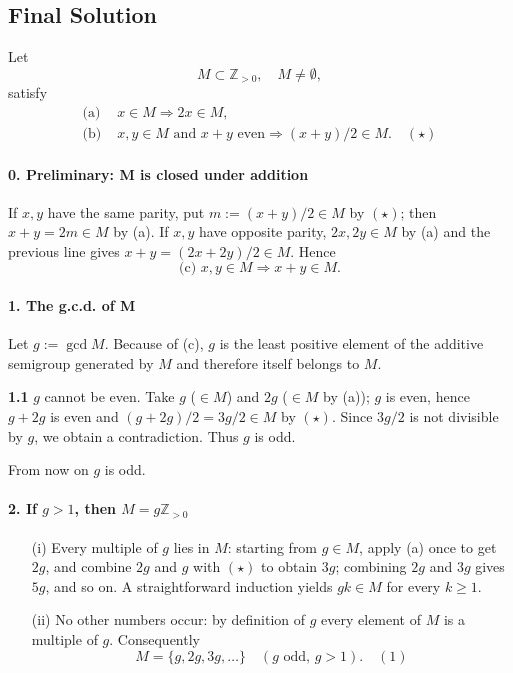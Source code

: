 \documentclass[12pt,a4paper]{article}
\theoremstyle{definition}
\begin{document}
\subsection{Final Solution}
Let
\[
M \subset \mathbb{Z}_{>0}, \quad M \neq \emptyset,
\]
satisfy
\begin{align}
\text{(a) } &x \in M \Rightarrow 2x \in M, \\
\text{(b) } &x, y \in M \text{ and } x+y \text{ even} \Rightarrow (x+y)/2 \in M. \quad (\star)
\end{align}

\paragraph{0. Preliminary: M is closed under addition}
If $x,y$ have the same parity, put $m := (x+y)/2 \in M$ by $(\star)$; then $x+y = 2m \in M$ by (a).
If $x,y$ have opposite parity, $2x,2y \in M$ by (a) and the previous line gives
$x+y = (2x+2y)/2 \in M$. Hence
\[
\text{(c) } x, y \in M \Rightarrow x+y \in M.
\]

\paragraph{1. The g.c.d. of M}
Let $g := \gcd M$. Because of (c), $g$ is the least positive element of the additive semigroup generated by $M$ and therefore itself belongs to $M$.

\textbf{1.1} $g$ cannot be even.
Take $g$ ($\in M$) and $2g$ ($\in M$ by (a)); $g$ is even, hence $g+2g$ is even and
$(g+2g)/2 = 3g/2 \in M$ by $(\star)$. Since $3g/2$ is not divisible by $g$, we obtain a contradiction. Thus $g$ is odd.

From now on $g$ is odd.

\paragraph{2. If $g > 1$, then $M = g\mathbb{Z}_{>0}$}
\begin{enumerate}
\item[(i)] Every multiple of $g$ lies in $M$:
starting from $g \in M$, apply (a) once to get $2g$, and combine $2g$ and $g$ with $(\star)$ to obtain $3g$; combining $2g$ and $3g$ gives $5g$, and so on. A straightforward induction yields $gk \in M$ for every $k \geq 1$.

\item[(ii)] No other numbers occur: by definition of $g$ every element of $M$ is a multiple of $g$. Consequently
\[
M = \{ g, 2g, 3g, \ldots \} \quad (g \text{ odd, } g > 1). \quad {(1)}
\]
\end{enumerate}
\end{document}
